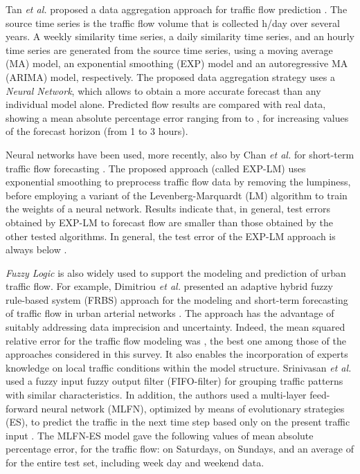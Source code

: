 \documentclass[10pt,onecolumn]{article}
\begin{document}
Tan \textit{et al.} proposed a data aggregation approach for traffic flow prediction \cite{Tan2009}. The source time series is the traffic flow volume that is collected  h/day over several years. A weekly similarity time series, a daily similarity time series, and an hourly time series are generated from the source time series, using a moving average (MA) model, an exponential smoothing (EXP) model and an autoregressive MA (ARIMA) model, respectively. The proposed data aggregation strategy uses a \textit{Neural Network}, which allows to obtain a more accurate forecast than any individual model alone. Predicted flow results are compared with real data, showing a mean absolute percentage error ranging from  to , for increasing values of the forecast horizon (from 1 to 3 hours).

Neural networks have been used, more recently, also by Chan \textit{et al.} for short-term traffic flow forecasting \cite{Chan2012}. The proposed approach (called EXP-LM) uses exponential smoothing to preprocess traffic flow data by removing the lumpiness, before employing a variant of the Levenberg-Marquardt (LM) algorithm to train the weights of a neural network. Results indicate that, in general, test errors obtained by EXP-LM to forecast flow  are smaller than those obtained by the other tested algorithms. In general, the test error of the EXP-LM approach is always below .

\textit{Fuzzy Logic} is also widely used to support the modeling and prediction of urban traffic flow. For example, Dimitriou \textit{et al.} presented an adaptive hybrid fuzzy rule-based system (FRBS) approach for the modeling and short-term forecasting of traffic flow in urban arterial networks \cite{Dimitriou2008}. The approach has the advantage of suitably addressing data imprecision and uncertainty. Indeed, the mean squared relative error for the traffic flow modeling was , the best one among those of the approaches considered in this survey. It also enables the incorporation of experts knowledge on local traffic conditions within the model structure.
Srinivasan \textit{et al.} used a fuzzy input fuzzy output filter (FIFO-filter) for grouping traffic patterns with similar characteristics. In addition, the authors used a multi-layer feed-forward neural network (MLFN), optimized by means of evolutionary strategies (ES), to predict the traffic in the next time step based only on the present traffic input \cite{Srinivasan2009}. The MLFN-ES model gave the following values of mean absolute percentage error, for the traffic flow:  on Saturdays,  on Sundays, and an average of  for the entire test set, including week day and weekend data.
\end{document}
